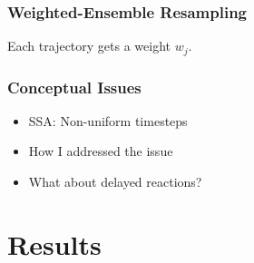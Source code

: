 \documentclass[xcolor={usenames,dvipsnames,svgnames},url=hyphens]{beamer}
\begin{document}
\begin{frame}
    \frametitle{Weighted-Ensemble Resampling}
    Each trajectory gets a weight $w_j$.\\
    \begin{overprint}
            \begin{center}
                
            \end{center}
            \begin{center}
                
            \end{center}
            \begin{center}
                
            \end{center}
            \begin{center}
                
            \end{center}
            \begin{center}
                
            \end{center}
    \end{overprint}
\end{frame}

\begin{frame}
    \frametitle{Conceptual Issues}

    \begin{center}
        
    \end{center}

    \begin{itemize}
        \item SSA: Non-uniform timesteps
        \item How I addressed the issue
        \pause
        \item What about delayed reactions?
    \end{itemize}

\end{frame}


\section{Results}
\end{document}
